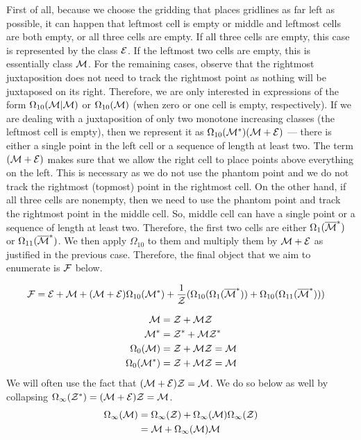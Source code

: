 \documentclass[12pt, a4paper, twoside]{report}
\begin{document}
First of all, because we choose the gridding that places gridlines as far left as possible, it can happen that leftmost cell is empty or middle and leftmost cells are both empty, or all three cells are empty. If all three cells are empty, this case is represented by the class $\mathcal{E}$. If the leftmost two cells are empty, this is essentially class $\mathcal{M}$. For the remaining cases, observe that the rightmost juxtaposition does not need to track the rightmost point as nothing will be juxtaposed on its right. Therefore, we are only interested in expressions of the form $\Omega_{10}(\mathcal{M}|\mathcal{M})$ or $\Omega_{10}(\mathcal{M})$ (when zero or one cell is empty, respectively). If we are dealing with a juxtaposition of only two monotone increasing classes (the leftmost cell is empty), then we represent it as $\Omega_{10}(\mathcal{M}^*)(\mathcal{M}+\mathcal{E})$ --- there is either a single point in the left cell or a sequence of length at least two. The term $(\mathcal{M}+\mathcal{E})$ makes sure that we allow the right cell to place points above everything on the left. This is necessary as we do not use the phantom point and we do not track the rightmost (topmost) point in the rightmost cell.  On the other hand, if all three cells are nonempty, then we need to use the phantom point and track the rightmost point in the middle cell. So, middle cell can have a single point or a sequence of length at least two. Therefore, the first two cells are either $\Omega_1(\overline{\mathcal{M}}^*)$ or $\Omega_{11}(\overline{\mathcal{M}}^*)$. We then apply $\Omega_{10}$ to them and multiply them by $\mathcal{M}+\mathcal{E}$ as justified in the previous case. Therefore, the final object that we aim to enumerate is $\mathcal{F}$ below.


\begin{align}
\mathcal{F} &= \mathcal{E} + \mathcal{M} + (\mathcal{M}+\mathcal{E})\Omega_{10}(\mathcal{M}^*) + \frac{1}{\mathcal{Z}}(\Omega_{10}(\Omega_1(\overline{\mathcal{M}}^*)) + \Omega_{10}(\Omega_{11}(\overline{\mathcal{M}}^*)))
\label{eq:mmm_final}
\end{align}

\begin{align}
  \mathcal{M} &= \mathcal{Z} + \mathcal{M}\mathcal{Z} \label{eq:mmm_m}\\
  \mathcal{M}^* &=  \mathcal{Z}^* + \mathcal{M}\mathcal{Z}^*\\
  \Omega_0(\mathcal{M})&= \mathcal{Z} + \mathcal{M}\mathcal{Z} = \mathcal{M}\\
  \Omega_0(\mathcal{M}^*) &= \mathcal{Z} + \mathcal{M}\mathcal{Z} = \mathcal{M}
\end{align}
We will often use the fact that $(\mathcal{M}+\mathcal{E})\mathcal{Z} = \mathcal{M}$. We do so below as well by collapsing $\Omega_\infty(\mathcal{Z}^*) = (\mathcal{M}+\mathcal{E})\mathcal{Z} = \mathcal{M}$.
\begin{align}
  \begin{aligned}
    \Omega_\infty(\mathcal{M}) &= \Omega_\infty(\mathcal{Z}) + \Omega_\infty(\mathcal{M})\Omega_\infty(\mathcal{Z})\\
    &= \mathcal{M} + \Omega_\infty(\mathcal{M})\mathcal{M}
  \end{aligned}
      \label{eq:mmm_omegainfty}
\end{align}
\end{document}
